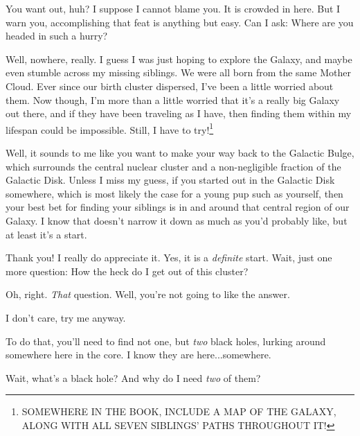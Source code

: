 \documentclass[main.tex]{subfiles}
\begin{document}
\par \Enrico You want out, huh?  I suppose I cannot blame you.  It is crowded in here.  But I warn you, accomplishing that feat is anything but easy.  Can I ask:  Where are you headed in such a hurry?

\par \Sterope Well, nowhere, really.  I guess I was just hoping to explore the Galaxy, and maybe even stumble across my missing siblings.  We were all born from the same Mother Cloud.  Ever since our birth cluster dispersed, I've been a little worried about them.  Now though, I'm more than a little worried that it's a really big Galaxy out there, and if they have been traveling as I have, then finding them within my lifespan could be impossible.  Still, I have to try!\footnote{SOMEWHERE IN THE BOOK, INCLUDE A MAP OF THE GALAXY, ALONG WITH ALL SEVEN SIBLINGS' PATHS THROUGHOUT IT!}

\par \Enrico Well, it sounds to me like you want to make your way back to the Galactic Bulge, which surrounds the central nuclear cluster and a non-negligible fraction of the Galactic Disk.  Unless I miss my guess, if you started out in the Galactic Disk somewhere, which is most likely the case for a young pup such as yourself, then your best bet for finding your siblings is in and around that central region of our Galaxy.  I know that doesn't narrow it down as much as you'd probably like, but at least it's a start.

\par \Sterope Thank you!  I really do appreciate it.  Yes, it is a \textit{definite} start.  Wait, just one more question:  How the heck do I get out of this cluster?

\par \Enrico Oh, right.  \textit{That} question.  Well, you're not going to like the answer.

\par \Sterope I don't care, try me anyway.

\par \Enrico To do that, you'll need to find not one, but \textit{two} black holes, lurking around somewhere here in the core.  I know they are here...somewhere.  

\par \Sterope Wait, what's a black hole?  And why do I need \textit{two} of them?
\end{document}
